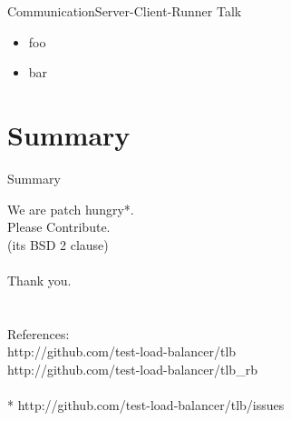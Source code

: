 \documentclass{beamer}
\begin{document}
\begin{frame}{Communication}{Server-Client-Runner Talk}
  \begin{centering}
    \begin{multicols}{2}
      \begin{itemize}
        \item foo
        \item bar
      \end{itemize}
    \end{multicols}
  \end{centering}
\end{frame}

\section*{Summary}

\begin{frame}{Summary}{}
  \begin{centering}
  {\huge We are patch hungry*.\\Please Contribute.\\}
  (its BSD 2 clause)\\
  \quad\\
  {\huge Thank you.}\\
  \quad\\
  \quad\\
  References:\\
  http://github.com/test-load-balancer/tlb\\
  http://github.com/test-load-balancer/tlb\_rb\\
  \quad\\
  * http://github.com/test-load-balancer/tlb/issues\\
  \end{centering}
\end{frame}




    
\end{document}
